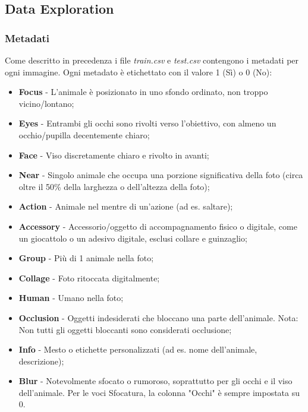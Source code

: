     

    \subsection{Data Exploration}
    
    \subsubsection{Metadati}
    Come descritto in precedenza i file \textit{train.csv} e \textit{test.csv} contengono i metadati per ogni immagine. Ogni metadato è etichettato con il valore 1 (Sì) o 0 (No):
        
    \begin{itemize}
        \item \textbf{Focus} - L'animale è posizionato in uno sfondo ordinato, non troppo vicino/lontano;
        \item \textbf{Eyes} - Entrambi gli occhi sono rivolti verso l'obiettivo, con almeno un occhio/pupilla decentemente chiaro;
        \item \textbf{Face} - Viso discretamente chiaro e rivolto in avanti;
        \item \textbf{Near} - Singolo animale che occupa una porzione significativa della foto (circa oltre il 50\% della larghezza o dell'altezza della foto);
        \item \textbf{Action} - Animale nel mentre di un'azione (ad es. saltare);
        \item \textbf{Accessory} - Accessorio/oggetto di accompagnamento fisico o digitale, come un giocattolo o un adesivo digitale, esclusi collare e guinzaglio;
        \item \textbf{Group} - Più di 1 animale nella foto;
        \item \textbf{Collage} - Foto ritoccata digitalmente;
        \item \textbf{Human} - Umano nella foto;
        \item \textbf{Occlusion} - Oggetti indesiderati che bloccano una parte dell'animale. Nota: Non tutti gli oggetti bloccanti sono considerati occlusione;
        \item \textbf{Info} - Mesto o etichette personalizzati (ad es. nome dell'animale, descrizione);
        \item \textbf{Blur} - Notevolmente sfocato o rumoroso, soprattutto per gli occhi e il viso dell'animale. Per le voci Sfocatura, la colonna "Occhi" è sempre impostata su 0.
    \end{itemize}

